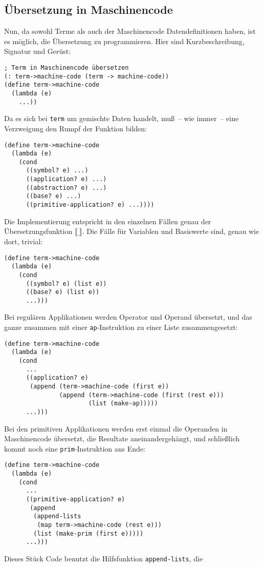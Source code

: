 \subsection{Übersetzung in Maschinencode}

Nun, da sowohl Terme als auch der Maschinencode Datendefinitionen
haben, ist es möglich, die Übersetzung zu programmieren.  Hier sind
Kurzbeschreibung, Signatur und Gerüst:
%
\begin{verbatim}
; Term in Maschinencode übersetzen
(: term->machine-code (term -> machine-code))
(define term->machine-code
  (lambda (e)
    ...))
\end{verbatim}
%
Da es sich bei \texttt{term} um gemischte Daten handelt, muß~-- wie
immer~-- eine Verzweigung den Rumpf der Funktion bilden:
%
\begin{verbatim}
(define term->machine-code
  (lambda (e)
    (cond
      ((symbol? e) ...)
      ((application? e) ...)
      ((abstraction? e) ...)
      ((base? e) ...)
      ((primitive-application? e) ...))))
\end{verbatim}
%
Die Implementierung entspricht in den einzelnen Fällen genau der
Übersetzungsfunktion $\llbracket\underline{~}\rrbracket$. Die Fälle
für Variablen und Basiswerte sind, genau wie dort, trivial:
%
\begin{verbatim}
(define term->machine-code
  (lambda (e)
    (cond
      ((symbol? e) (list e))
      ((base? e) (list e))
      ...)))
\end{verbatim}
%
Bei regulären Applikationen werden
Operator und Operand übersetzt, und das ganze zusammen mit einer
\texttt{ap}-Instruktion zu einer Liste zusammengesetzt:
%
\begin{verbatim}
(define term->machine-code
  (lambda (e)
    (cond
      ...
      ((application? e)
       (append (term->machine-code (first e))
               (append (term->machine-code (first (rest e)))
                       (list (make-ap)))))
      ...)))
\end{verbatim}
%
Bei den primitiven Applikationen werden erst einmal die Operanden in
Maschinencode übersetzt, die Resultate aneinandergehängt, und
schließlich kommt noch eine \texttt{prim}-Instruktion ans Ende:
%
\begin{verbatim}
(define term->machine-code
  (lambda (e)
    (cond
      ...
      ((primitive-application? e)
       (append
        (append-lists
         (map term->machine-code (rest e)))
        (list (make-prim (first e)))))
      ...)))
\end{verbatim}
%
Dieses Stück Code benutzt die Hilfsfunktion \texttt{append-lists}, die

